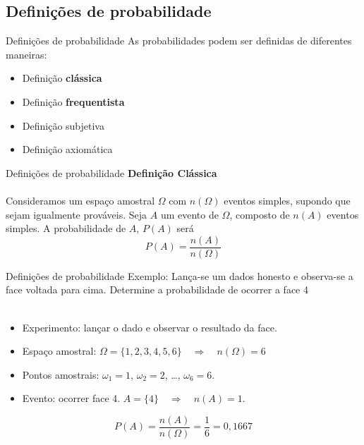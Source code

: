 \documentclass[10pt]{beamer}\usepackage[]{graphicx}\usepackage[]{color}
\theoremstyle{definition}
\begin{document}
\subsection{Definições de probabilidade}

\begin{frame}{Definições de probabilidade}
  As probabilidades podem ser definidas de diferentes maneiras:
  \begin{itemize}
  \item Definição \textbf{clássica}
  \item Definição \textbf{frequentista}
  \item Definição subjetiva
  \item Definição axiomática
  \end{itemize}
\end{frame}

\begin{frame}{Definições de probabilidade}
  \textbf{Definição Clássica}\\~\\
  Consideramos um espaço amostral $\Omega$ com $n(\Omega)$ eventos simples,
  supondo que sejam igualmente prováveis. Seja $A$ um evento de
  $\Omega$, composto de $n(A)$ eventos simples. A probabilidade de $A$,
  $P(A)$ será
  \begin{equation*}
    P(A) = \frac{n(A)}{n(\Omega)}
  \end{equation*}
\end{frame}

\begin{frame}{Definições de probabilidade}
  Exemplo: Lança-se um dados honesto e observa-se a face voltada para
  cima. Determine a probabilidade de ocorrer a face 4\\~\\ \pause
  \begin{itemize}
  \item Experimento: lançar o dado e observar o resultado da
    face.
  \item Espaço amostral: $\Omega=\{1,2,3,4,5,6\} \quad \Rightarrow \quad
    n(\Omega) = 6$
  \item Pontos amostrais: $\omega_1=\text{1}$, $\omega_2=\text{2}$,
    \ldots, $\omega_6=\text{6}$.
  \item Evento: ocorrer face 4. $A = \{4\} \quad \Rightarrow \quad n(A) = 1$.
  \end{itemize}
  \begin{equation*}
    P(A) = \frac{n(A)}{n(\Omega)} = \frac{1}{6} = 0,1667
  \end{equation*}
\end{frame}
\end{document}
